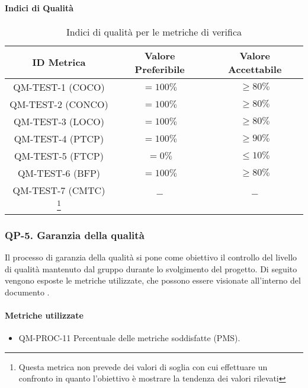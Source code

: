 		\paragraph{Indici di Qualità}
			\begin{center}
				\begin{longtable}{|c|c|c|}
				\hline
				\rowcolor{lighter-grayer}
				\textbf{ID Metrica} & \textbf{Valore Preferibile} & \textbf{Valore Accettabile}\\
				\hline
				\endfirsthead
				\hline
				QM-TEST-1 (COCO) & \(= 100\%\) & \(\geq 80\%\) \\ \hline
				QM-TEST-2 (CONCO) & \(= 100\%\) & \(\geq 80\%\) \\ \hline
				QM-TEST-3 (LOCO) & \(= 100\%\) & \(\geq 80\%\) \\ \hline
				QM-TEST-4 (PTCP) & \(= 100\%\) & \(\geq 90\%\) \\ \hline
				QM-TEST-5 (FTCP) & \(= 0\%\) & \(\le 10\%\) \\ \hline
				QM-TEST-6 (BFP) & \(= 100\%\) & \(\geq 80\%\) \\ \hline
				QM-TEST-7 (CMTC) \footnote{Questa metrica non prevede dei valori di soglia con cui effettuare un confronto in quanto l'obiettivo è mostrare la tendenza dei valori rilevati} & \(-\) & \(-\) \\ \hline
				\hline
				\caption{Indici di qualità per le metriche di verifica}
				\end{longtable}
			\end{center}
	\newpage
	\subsubsection{QP-5. Garanzia della qualità}
	
	Il processo di garanzia della qualità si pone come obiettivo il controllo del livello di qualità mantenuto dal gruppo durante lo svolgimento del progetto.
	\newline
	Di seguito vengono esposte le metriche utilizzate, che possono essere visionate all'interno del documento .
	
	\paragraph{Metriche utilizzate}
	
	\begin{itemize}
		\item QM-PROC-11 Percentuale delle metriche soddisfatte (PMS).
	\end{itemize}
	
